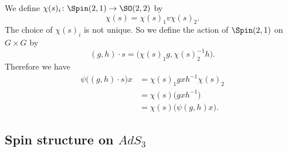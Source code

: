 We define $\chi(s)_i\colon \Spin(2,1)\to \SO(2,2)$ by
\[
	\chi(s)=\chi(s)_1v\chi(s)_2.
\]
The choice of $\chi(s)_i$ is not unique. So we define the action of $\Spin(2,1)$ on $G\times G$ by
\begin{equation}
	(g,h)\cdot s=\big( \chi(s)_1g,\chi(s)_2^{-1}h \big).
\end{equation}
Therefore we have
\[
	\begin{split}
		\psi\big( (g,h)\cdot s \big)x&=\chi(s)_1gxh^{-1}\chi(s)_2\\
		&=\chi(s)\big( gxh^{-1} \big)\\
		&=\chi(s)\big(\psi(g,h)x\big).
	\end{split}
\]
\subsection{Spin structure on \texorpdfstring{$AdS_3$}{AdS3}}

